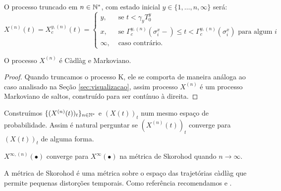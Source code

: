 O processo truncado em $n \in {\mathbb{N^*}}$, com estado inicial $y \in \{1,
\ldots, n, \infty\}$ será:
\begin{displaymath}
  X^{(n)}(t) = X^{y,(n)}_c(t) = \begin{cases}
    y, & \textrm{ se }  t < \gamma_y T_0^y\\
    x, & \textrm{ se } \Gamma^{y,(n)}_c(\sigma_i^x-) \leq t <
    \Gamma^{y,(n)}_c(\sigma^x_i)
    \text{ para algum } i \\
    \infty, & \textrm{ caso contrário.}
  \end{cases}
\end{displaymath}

\begin{proposicao}
  O processo $X^{(n)}$ é Càdlàg e Markoviano.
\end{proposicao}
\begin{proof}
  Quando truncamos o processo K, ele se comporta de maneira análoga ao
  caso analisado na Seção \ref{sec:visualizacao}, assim processo
  $X^{(n)}$ é um processo Markoviano de saltos, construído para ser
  contínuo à direita.
\end{proof}

Construímos $\{(X^{(n)}(t))_t\}_{n \in {\mathbb{N^*}}}$ e $(X(t))_t$ num mesmo
espaço de probabilidade. Assim é natural perguntar se $(X^{(n)}(t))_t$
converge para $(X(t))_t$ de alguma forma.

\begin{teorema}
  \label{teo:convergencia}
  $X^{\infty, (n)} (\bullet)$ converge para $X^\infty(\bullet)$ \qc na
  métrica de Skorohod quando $n \to \infty$.
\end{teorema}

A métrica de Skorohod é uma métrica sobre o espaço das trajetórias
càdlàg que permite pequenas distorções temporais. Como
referência recomendamos \cite{billingsley:99} e \cite{ethier:86}.

